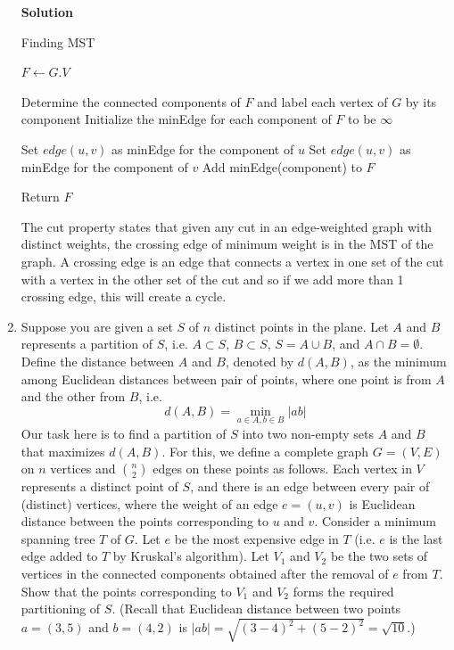 \documentclass[12pt]{article}
\begin{document}
\begin{enumerate}
\color{black}
\textbf{Solution} 
\begin{algorithm}
\caption{Finding MST}
\begin{algorithmic}[1]
	\State $F \gets G.V$ 

		\State Determine the connected components of $F$ and label each vertex of $G$ by its component
		\State Initialize the minEdge for each component of $F$ to be $\infty$
				
					\State Set $edge(u,v)$ as minEdge for the component of $u$
				\EndIf
					\State Set $edge(u,v)$ as minEdge for the component of $v$
				\EndIf
			\EndIf
		\EndFor
				\State Add minEdge(component) to $F$
		\EndFor			
	\EndWhile

	\State Return $F$
\EndProcedure
\end{algorithmic}
\end{algorithm}

The cut property states that given any cut in an edge-weighted graph with distinct weights, the crossing edge of minimum weight is in the MST of the graph. A crossing edge is an edge that connects a vertex in one set of the cut with a vertex in the other set of the cut and so if we add more than 1 crossing edge, this will create a cycle. 

\item \color{blue} Suppose you are given a set $S$ of $n$ distinct points in the plane.   Let $A$ and $B$ represents a partition of $S$, i.e. $A\subset S$, $B\subset S$, $S=A\cup B$, and $A\cap B=\emptyset$. Define the distance between $A$ and $B$, denoted by  $d(A,B)$, as the minimum among Euclidean distances between pair of points, where one point is from  $A$ and the other from $B$, i.e. 
$$d(A,B)=\min_{a\in A, b\in B}|ab|$$  
Our task here is to find a partition of $S$ into two non-empty sets $A$ and $B$ that maximizes $d(A,B)$. For this, we define a complete graph $G=(V,E)$ on $n$ vertices and ${n\choose 2}$ edges on these points as follows. Each vertex in $V$ represents a distinct point of $S$, and there is an edge between every pair of (distinct) vertices, where the weight of an edge 
$e=(u,v)$ is Euclidean distance between the points corresponding to $u$ and $v$. Consider a minimum spanning tree $T$ of $G$. Let $e$ be the most expensive edge in $T$ (i.e. $e$ is the last edge added to $T$ by Kruskal's algorithm). Let $V_1$ and $V_2$ be the two sets of vertices in the connected components obtained after the removal of $e$ from $T$. Show that the points  corresponding to $V_1$ and $V_2$ forms the required partitioning of $S$.       (Recall that Euclidean distance between  two points  $a=(3,5)$ and $b=(4,2)$ is $|ab|=\sqrt{(3-4)^2+(5-2)^2}= \sqrt{10}$.) 


\end{enumerate}
\end{document}

